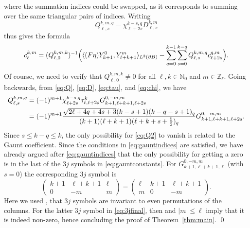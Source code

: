 \documentclass[reqno]{amsart}
\numberwithin{equation}{section}
\numberwithin{figure}{section}
\numberwithin{table}{section}
\theoremstyle{plain}
\theoremstyle{definition}
\theoremstyle{remark}
\newcommand{\abs}[1]{\lvert#1\rvert}
\newcommand{\inner}[1]{\langle#1\rangle}
\newcommand{\N}{\mathbb{N}}
\newcommand{\Z}{\mathbb{Z}}
\begin{document}
%
where the summation indices could be swapped, as it corresponds to summing over the same triangular pairs of indices. Writing
%
\begin{equation} \label{eq:Q}
    Q_{\ell,s}^{k,m,q} = \chi_{\ell+2s}^{k-s,q} D_{\ell,s}^{k,m}
\end{equation}
%
thus gives the formula
%
\begin{equation*}
    c_{\ell}^{k,m} = (Q_{\ell,0}^{k,m,k})^{-1}\Bigl( \inner{(F\eta)Y_{k+1}^0,Y_{\ell+k+1}^m}_{L^2(\partial B)} - \sum_{q=0}^{k-1}\sum_{s = 0}^{k-q}Q_{\ell,s}^{k,m,q}c_{\ell+2s}^{q,m} \Bigr).
\end{equation*}
%
Of course, we need to verify that $Q_{\ell,0}^{k,m,k} \neq 0$ for all $\ell,k\in\N_0$ and $m\in\Z_\ell$. Going backwards, from \eqref{eq:Q}, \eqref{eq:D}, \eqref{eq:tau}, and \eqref{eq:chi}, we have
%
\begin{align}
    Q_{\ell,s}^{k,m,q} &= (-1)^{m+1}\chi_{\ell+2s}^{k-s,q} \tau_{\ell,\ell+2s}^k G_{k+1,\ell+k+1,\ell+2s}^{0,-m,m} \notag \\
    &= (-1)^{m+1}\frac{\sqrt{2\ell+4q+4s+3}(k-s+1)(k-q-s+1)_q}{(k+1)(\ell+k+1)(\ell+k+s+\tfrac{5}{2})_q}G_{k+1,\ell+k+1,\ell+2s}^{0,-m,m}. \label{eq:Q2}
\end{align}
%
Since $s \leq k-q \leq k$, the only possibility for \eqref{eq:Q2} to vanish is related to the Gaunt coefficient. Since the conditions in \eqref{eq:gauntindices} are satisfied, we have already argued after \eqref{eq:gauntindices} that the only possibility for getting a zero is in the last of the $3j$ symbols in \eqref{eq:gauntconstants}. For $G_{k+1,\ell+k+1,\ell}^{0,-m,m}$ (with $s=0$) the corresponding $3j$ symbol is
%
\begin{equation} \label{eq:3jfinal}
    \begin{pmatrix}
        k+1 & \ell+k+1 & \ell \\
        0 & -m & m
    \end{pmatrix} = 
    \begin{pmatrix}
        \ell & k+1 & \ell+k+1 \\
        m & 0 & -m
    \end{pmatrix}.
\end{equation}
%
Here we used \cite[§34.3(ii)~Eq.~34.3.8]{NIST}, that $3j$ symbols are invariant to even permutations of the columns. For the latter $3j$ symbol in \eqref{eq:3jfinal}, then \cite[§34.3(i)~Eq.~34.3.6]{NIST} and $\abs{m}\leq\ell$ imply that it is indeed non-zero, hence concluding the proof of Theorem~\ref{thm:main}. \hfill \qed
\end{document}
